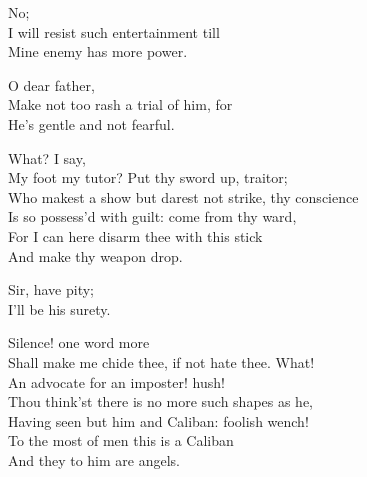 \begin{verse_speech}[Ferdinand] 
No;\\
I will resist such entertainment till\\
Mine enemy has more power.
\end{verse_speech}


\begin{verse_speech}[Miranda] 
O dear father,\\
Make not too rash a trial of him, for\\
He's gentle and not fearful.
\end{verse_speech}

\begin{verse_speech}[Prospero] 
What? I say,\\
My foot my tutor? Put thy sword up, traitor;\\
Who makest a show but darest not strike, thy conscience\\
Is so possess'd with guilt: come from thy ward,\\
For I can here disarm thee with this stick\\
And make thy weapon drop.
\end{verse_speech}

	
	
\begin{verse_speech}[Miranda] 
Sir, have pity;\\
I'll be his surety.
\end{verse_speech}

\begin{verse_speech}[Prospero] 
Silence! one word more\\
Shall make me chide thee, if not hate thee. What!\\
An advocate for an imposter! hush!\\
Thou think'st there is no more such shapes as he,\\
Having seen but him and Caliban: foolish wench!\\
To the most of men this is a Caliban\\
And they to him are angels.
\end{verse_speech}

